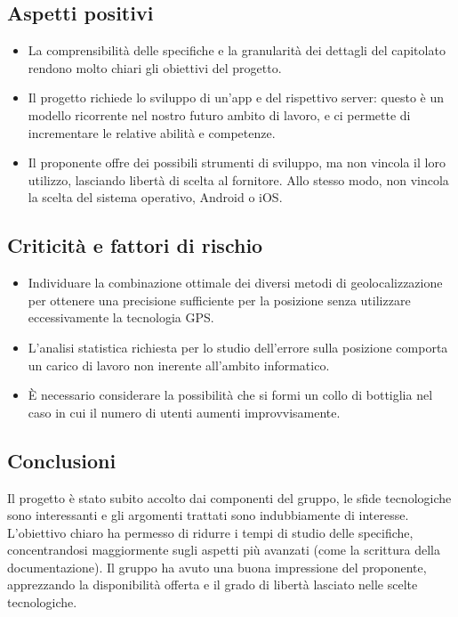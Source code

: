 \documentclass[../studio-di-fattibilita.tex]{subfiles}
\begin{document}
	\subsection{Aspetti positivi}
	\label{sec:aspetti_positivi}
	\begin{itemize}
		\item La comprensibilità delle specifiche e la granularità dei dettagli del capitolato rendono molto chiari gli obiettivi del progetto.
		\item Il progetto richiede lo sviluppo di un'app e del rispettivo server: questo è un modello ricorrente nel nostro futuro ambito di lavoro, e ci permette di incrementare le relative abilità e competenze.
		\item Il proponente offre dei possibili strumenti di sviluppo, ma non vincola il loro utilizzo, lasciando libertà di scelta al fornitore. Allo stesso modo, non vincola la scelta del sistema operativo, Android o iOS.
	\end{itemize}
	\subsection{Criticità e fattori di rischio}
	\label{sec:criticità_e_fattori_di_rischio}
	\begin{itemize}
		\item Individuare la combinazione ottimale dei diversi metodi di geolocalizzazione per ottenere una precisione sufficiente per la posizione senza utilizzare eccessivamente la tecnologia GPS.
		\item L'analisi statistica richiesta per lo studio dell'errore sulla posizione comporta un carico di lavoro non inerente all'ambito informatico.
		\item È necessario considerare la possibilità che si formi un collo di bottiglia nel caso in cui il numero di utenti aumenti improvvisamente.
	\end{itemize}
	\subsection{Conclusioni}
	\label{sec:conclusioni}
	Il progetto è stato subito accolto dai componenti del gruppo, le sfide tecnologiche sono interessanti e gli argomenti trattati sono indubbiamente di interesse. L'obiettivo chiaro ha permesso di ridurre i tempi di studio delle specifiche, concentrandosi maggiormente sugli aspetti più avanzati (come la scrittura della documentazione). Il gruppo ha avuto una buona impressione del proponente, apprezzando la disponibilità offerta e il grado di libertà lasciato nelle scelte tecnologiche. 
\end{document}
